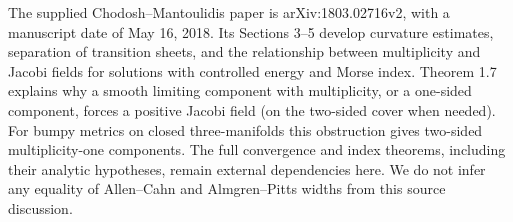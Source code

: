 \begin{remark}\label{rem:allen-cahn-minmax}
The supplied Chodosh--Mantoulidis paper \cite{CM} is arXiv:1803.02716v2, with a manuscript date of May 16, 2018. Its Sections 3--5 develop curvature estimates, separation of transition sheets, and the relationship between multiplicity and Jacobi fields for solutions with controlled energy and Morse index. Theorem 1.7 explains why a smooth limiting component with multiplicity, or a one-sided component, forces a positive Jacobi field (on the two-sided cover when needed). For bumpy metrics on closed three-manifolds this obstruction gives two-sided multiplicity-one components. The full convergence and index theorems, including their analytic hypotheses, remain external dependencies here. We do not infer any equality of Allen--Cahn and Almgren--Pitts widths from this source discussion.
\end{remark}
